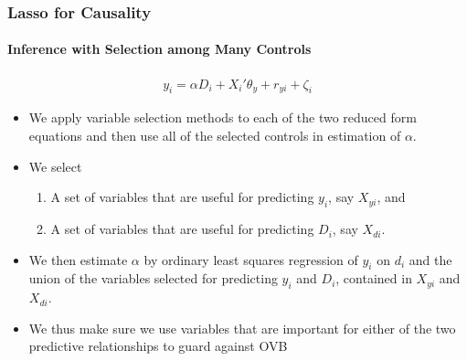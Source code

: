 \documentclass[
  shownotes,
  xcolor={svgnames},
  hyperref={colorlinks,citecolor=DarkBlue,linkcolor=DarkRed,urlcolor=DarkBlue}
  , aspectratio=169]{beamer}
\begin{document}
\begin{frame}[fragile]
\frametitle{Lasso for Causality}
\framesubtitle{Inference with Selection among Many Controls}

\begin{align}
    y_i = \alpha D_i + X_i'\theta_y +r_{yi} + \zeta_i
  \end{align}

\begin{itemize}
\item We apply variable selection methods to each of the two reduced form equations and then use all of the selected controls in estimation of $\alpha$. 
\medskip
\item We select
\begin{enumerate}
\item A set of variables that are useful for predicting $y_i$, say $X_{yi}$, and 
\item A set of variables that are useful for predicting $D_i$, say $X_{di}$.

\end{enumerate}
\item We then estimate $\alpha$ by ordinary least squares regression of $y_i$ on $d_i$ and the union of the variables selected for predicting $y_i$ and $D_i$, contained in $X_{yi}$ and $X_{di}$. 

\item We thus make sure we use variables that are important for either of the two predictive relationships to guard against OVB

\end{itemize}
\end{frame}
\end{document}
